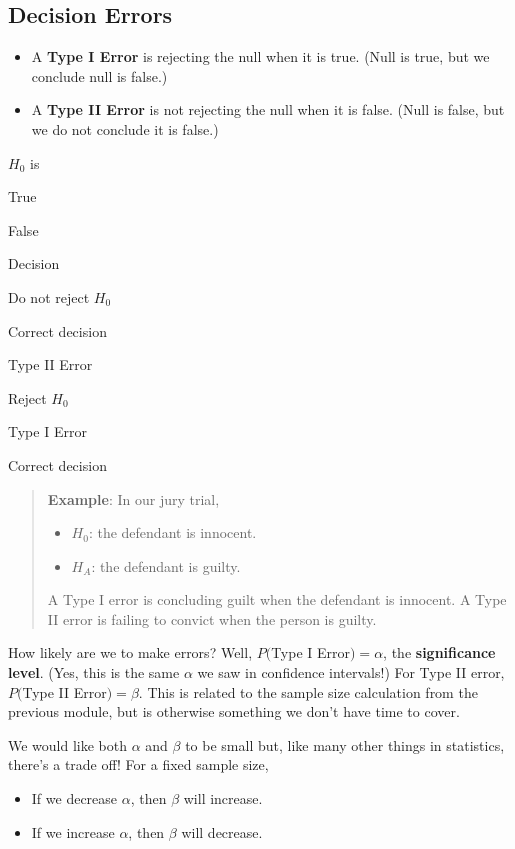 \documentclass[
]{book}
\providecommand{\tightlist}{%
  \setlength{\itemsep}{0pt}\setlength{\parskip}{0pt}}
\begin{document}
\subsection{Decision Errors}\label{decision-errors}

\begin{itemize}
\tightlist
\item
  A \textbf{Type I Error} is rejecting the null when it is true. (Null is true, but we conclude null is false.)
\item
  A \textbf{Type II Error} is not rejecting the null when it is false. (Null is false, but we do not conclude it is false.)
\end{itemize}

\(H_0\) is

True

False

Decision

Do not reject \(H_0\)

Correct decision

Type II Error

Reject \(H_0\)

Type I Error

Correct decision

\begin{quote}
\textbf{Example}: In our jury trial,

\begin{itemize}
\tightlist
\item
  \(H_0\): the defendant is innocent.
\item
  \(H_A\): the defendant is guilty.
\end{itemize}

A Type I error is concluding guilt when the defendant is innocent. A Type II error is failing to convict when the person is guilty.
\end{quote}

How likely are we to make errors? Well, \(P(\)Type I Error\()=\alpha\), the \textbf{significance level}. (Yes, this is the same \(\alpha\) we saw in confidence intervals!) For Type II error, \(P(\)Type II Error\()=\beta\). This is related to the sample size calculation from the previous module, but is otherwise something we don't have time to cover.

We would like both \(\alpha\) and \(\beta\) to be small but, like many other things in statistics, there's a trade off! For a fixed sample size,

\begin{itemize}
\tightlist
\item
  If we decrease \(\alpha\), then \(\beta\) will increase.
\item
  If we increase \(\alpha\), then \(\beta\) will decrease.
\end{itemize}
\end{document}
